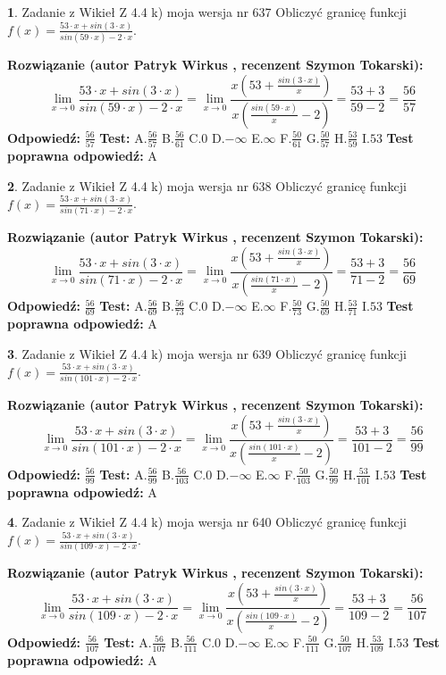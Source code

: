 \documentclass[12pt, a4paper]{article}
\theoremstyle{definition} %
\newtheorem{zad}{}
\newcommand{\zadStart}[1]{\begin{zad}#1\newline}
\newcommand{\zadStop}{\end{zad}}
\newcommand{\rozwStart}[2]{\noindent \textbf{Rozwiązanie (autor #1 , recenzent #2): }\newline}
\newcommand{\rozwStop}{\newline}
\newcommand{\odpStart}{\noindent \textbf{Odpowiedź:}\newline}
\newcommand{\odpStop}{\newline}
\newcommand{\testStart}{\noindent \textbf{Test:}\newline}
\newcommand{\testStop}{\newline}
\newcommand{\kluczStart}{\noindent \textbf{Test poprawna odpowiedź:}\newline}
\newcommand{\kluczStop}{\newline}
\begin{document}
\zadStart{Zadanie z Wikieł Z 4.4 k) moja wersja nr 637}
Obliczyć granicę funkcji $f(x)=\frac{53\cdot x +sin(3\cdot x)}{sin(59\cdot x) -2\cdot x}$.
\zadStop
\rozwStart{Patryk Wirkus}{Szymon Tokarski}
$$\lim\limits_{x\to 0}\frac{53\cdot x +sin(3\cdot x)}{sin(59\cdot x) -2\cdot x}
=\lim\limits_{x\to 0}\frac{x(53+\frac{sin(3\cdot x)}{x})}{x(\frac{sin(59\cdot x)}{x}-2)}
=\frac{53+3}{59-2} = \frac{56}{57}$$
\rozwStop
\odpStart
$\frac{56}{57}$
\odpStop
\testStart
A.$\frac{56}{57}$
B.$\frac{56}{61}$
C.$0$
D.$-\infty$
E.$\infty$
F.$\frac{50}{61}$
G.$\frac{50}{57}$
H.$\frac{53}{59}$
I.$53$
\testStop
\kluczStart
A
\kluczStop



\zadStart{Zadanie z Wikieł Z 4.4 k) moja wersja nr 638}
Obliczyć granicę funkcji $f(x)=\frac{53\cdot x +sin(3\cdot x)}{sin(71\cdot x) -2\cdot x}$.
\zadStop
\rozwStart{Patryk Wirkus}{Szymon Tokarski}
$$\lim\limits_{x\to 0}\frac{53\cdot x +sin(3\cdot x)}{sin(71\cdot x) -2\cdot x}
=\lim\limits_{x\to 0}\frac{x(53+\frac{sin(3\cdot x)}{x})}{x(\frac{sin(71\cdot x)}{x}-2)}
=\frac{53+3}{71-2} = \frac{56}{69}$$
\rozwStop
\odpStart
$\frac{56}{69}$
\odpStop
\testStart
A.$\frac{56}{69}$
B.$\frac{56}{73}$
C.$0$
D.$-\infty$
E.$\infty$
F.$\frac{50}{73}$
G.$\frac{50}{69}$
H.$\frac{53}{71}$
I.$53$
\testStop
\kluczStart
A
\kluczStop



\zadStart{Zadanie z Wikieł Z 4.4 k) moja wersja nr 639}
Obliczyć granicę funkcji $f(x)=\frac{53\cdot x +sin(3\cdot x)}{sin(101\cdot x) -2\cdot x}$.
\zadStop
\rozwStart{Patryk Wirkus}{Szymon Tokarski}
$$\lim\limits_{x\to 0}\frac{53\cdot x +sin(3\cdot x)}{sin(101\cdot x) -2\cdot x}
=\lim\limits_{x\to 0}\frac{x(53+\frac{sin(3\cdot x)}{x})}{x(\frac{sin(101\cdot x)}{x}-2)}
=\frac{53+3}{101-2} = \frac{56}{99}$$
\rozwStop
\odpStart
$\frac{56}{99}$
\odpStop
\testStart
A.$\frac{56}{99}$
B.$\frac{56}{103}$
C.$0$
D.$-\infty$
E.$\infty$
F.$\frac{50}{103}$
G.$\frac{50}{99}$
H.$\frac{53}{101}$
I.$53$
\testStop
\kluczStart
A
\kluczStop



\zadStart{Zadanie z Wikieł Z 4.4 k) moja wersja nr 640}
Obliczyć granicę funkcji $f(x)=\frac{53\cdot x +sin(3\cdot x)}{sin(109\cdot x) -2\cdot x}$.
\zadStop
\rozwStart{Patryk Wirkus}{Szymon Tokarski}
$$\lim\limits_{x\to 0}\frac{53\cdot x +sin(3\cdot x)}{sin(109\cdot x) -2\cdot x}
=\lim\limits_{x\to 0}\frac{x(53+\frac{sin(3\cdot x)}{x})}{x(\frac{sin(109\cdot x)}{x}-2)}
=\frac{53+3}{109-2} = \frac{56}{107}$$
\rozwStop
\odpStart
$\frac{56}{107}$
\odpStop
\testStart
A.$\frac{56}{107}$
B.$\frac{56}{111}$
C.$0$
D.$-\infty$
E.$\infty$
F.$\frac{50}{111}$
G.$\frac{50}{107}$
H.$\frac{53}{109}$
I.$53$
\testStop
\kluczStart
A
\kluczStop
\end{document}
